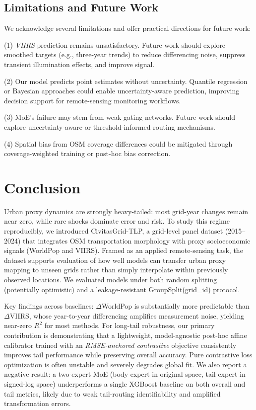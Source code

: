 \documentclass[preprint,12pt]{elsarticle}
\begin{document}
\subsection{Limitations and Future Work}

We acknowledge several limitations and offer practical directions for future work:

(1) \textit{VIIRS} prediction remains unsatisfactory. Future work should explore smoothed targets (e.g., three-year trends) to reduce differencing noise, suppress transient illumination effects, and improve signal.

(2) Our model predicts point estimates without uncertainty. Quantile regression or Bayesian approaches could enable uncertainty-aware prediction, improving decision support for remote-sensing monitoring workflows.

(3) MoE's failure may stem from weak gating networks. Future work should explore uncertainty-aware or threshold-informed routing mechanisms.

(4) Spatial bias from OSM coverage differences could be mitigated through coverage-weighted training or post-hoc bias correction.

\section{Conclusion}

Urban proxy dynamics are strongly heavy-tailed: most grid-year changes remain near zero, while rare shocks dominate error and risk. To study this regime reproducibly, we introduced CivitasGrid-TLP, a grid-level panel dataset (2015--2024) that integrates OSM transportation morphology with proxy socioeconomic signals (WorldPop and VIIRS). Framed as an applied remote-sensing task, the dataset supports evaluation of how well models can transfer urban proxy mapping to unseen grids rather than simply interpolate within previously observed locations. We evaluated models under both random splitting (potentially optimistic) and a leakage-resistant GroupSplit(grid\_id) protocol.

Key findings across baselines: $\Delta$WorldPop is substantially more predictable than $\Delta$VIIRS, whose year-to-year differencing amplifies measurement noise, yielding near-zero $R^2$ for most methods. For long-tail robustness, our primary contribution is demonstrating that a lightweight, model-agnostic post-hoc affine calibrator trained with an \emph{RMSE-anchored contrastive} objective consistently improves tail performance while preserving overall accuracy. Pure contrastive loss optimization is often unstable and severely degrades global fit. We also report a negative result: a two-expert MoE (body expert in original space, tail expert in signed-log space) underperforms a single XGBoost baseline on both overall and tail metrics, likely due to weak tail-routing identifiability and amplified transformation errors.
\end{document}
